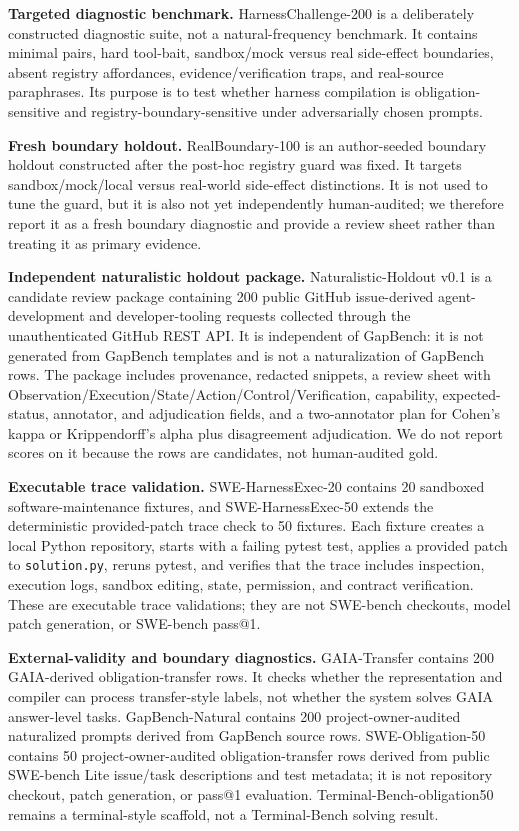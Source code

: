 \documentclass[
  10pt,
]{article}
\begin{document}
\textbf{Targeted diagnostic benchmark.} HarnessChallenge-200 is a
deliberately constructed diagnostic suite, not a natural-frequency
benchmark. It contains minimal pairs, hard tool-bait, sandbox/mock
versus real side-effect boundaries, absent registry affordances,
evidence/verification traps, and real-source paraphrases. Its purpose is
to test whether harness compilation is obligation-sensitive and
registry-boundary-sensitive under adversarially chosen prompts.

\textbf{Fresh boundary holdout.} RealBoundary-100 is an author-seeded
boundary holdout constructed after the post-hoc registry guard was
fixed. It targets sandbox/mock/local versus real-world side-effect
distinctions. It is not used to tune the guard, but it is also not yet
independently human-audited; we therefore report it as a fresh boundary
diagnostic and provide a review sheet rather than treating it as primary
evidence.

\textbf{Independent naturalistic holdout package.} Naturalistic-Holdout
v0.1 is a candidate review package containing 200 public GitHub
issue-derived agent-development and developer-tooling requests collected
through the unauthenticated GitHub REST API. It is independent of
GapBench: it is not generated from GapBench templates and is not a
naturalization of GapBench rows. The package includes provenance,
redacted snippets, a review sheet with
Observation/Execution/State/Action/Control/Verification, capability,
expected-status, annotator, and adjudication fields, and a two-annotator
plan for Cohen's kappa or Krippendorff's alpha plus disagreement
adjudication. We do not report scores on it because the rows are
candidates, not human-audited gold.

\textbf{Executable trace validation.} SWE-HarnessExec-20 contains 20
sandboxed software-maintenance fixtures, and SWE-HarnessExec-50 extends
the deterministic provided-patch trace check to 50 fixtures. Each
fixture creates a local Python repository, starts with a failing pytest
test, applies a provided patch to \texttt{solution.py}, reruns pytest,
and verifies that the trace includes inspection, execution logs, sandbox
editing, state, permission, and contract verification. These are
executable trace validations; they are not SWE-bench checkouts, model
patch generation, or SWE-bench pass@1.

\textbf{External-validity and boundary diagnostics.} GAIA-Transfer
contains 200 GAIA-derived obligation-transfer rows. It checks whether
the representation and compiler can process transfer-style labels, not
whether the system solves GAIA answer-level tasks. GapBench-Natural
contains 200 project-owner-audited naturalized prompts derived from
GapBench source rows. SWE-Obligation-50 contains 50
project-owner-audited obligation-transfer rows derived from public
SWE-bench Lite issue/task descriptions and test metadata; it is not
repository checkout, patch generation, or pass@1 evaluation.
Terminal-Bench-obligation50 remains a terminal-style scaffold, not a
Terminal-Bench solving result.
\end{document}
